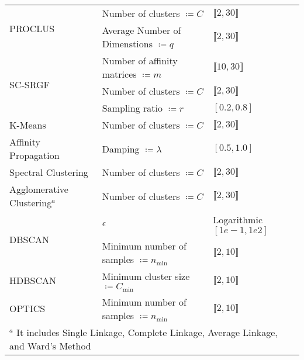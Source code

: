 \begin{table}[h]
\begin{center}
\begin{small}
\begin{sc}
\begin{tabular}{@{}lll@{}}
\multirow{2}{*}{PROCLUS}        & Number of clusters $\coloneqq C$                       & $\llbracket2,30\rrbracket$                     \\
                                & Average Number of Dimenstions $\coloneqq q$            & $\llbracket2,30\rrbracket$                     \\ \midrule
\multirow{3}{*}{SC-SRGF}        & Number of affinity matrices $\coloneqq m$              & $\llbracket10,30\rrbracket$                    \\
                                & Number of clusters $\coloneqq C$                       & $\llbracket2,30\rrbracket$                     \\
                                & Sampling ratio $\coloneqq r$                           & $\left[0.2,0.8\right]$                         \\ \midrule
K-Means                         & Number of clusters $\coloneqq C$                       & $\llbracket2,30\rrbracket$                     \\ \midrule
Affinity Propagation            & Damping $\coloneqq \lambda$                            & $\left[0.5,1.0\right]$                         \\ \midrule
Spectral Clustering             & Number of clusters $\coloneqq C$                       & $\llbracket2,30\rrbracket$                     \\ \midrule
Agglomerative Clustering$^a$    & Number of clusters $\coloneqq C$                       & $\llbracket2,30\rrbracket$                     \\ \midrule
\multirow{2}{*}{DBSCAN}         & $\epsilon$                                             & Logarithmic $\left[1e-1,1e2\right]$            \\
                                & Minimum number of samples $\coloneqq n_{\text{min}}$   & $\llbracket2,10\rrbracket$                     \\ \midrule
HDBSCAN                         & Minimum cluster size $\coloneqq C_{\text{min}}$        & $\llbracket2,10\rrbracket$                     \\ \midrule
OPTICS                          & Minimum number of samples $\coloneqq n_{\text{min}}$   & $\llbracket2,10\rrbracket$                     \\ \bottomrule
\multicolumn{3}{l}{\footnotesize{$^a$ It includes Single Linkage, Complete Linkage, Average Linkage, and Ward’s Method}}
\end{tabular}
    \end{sc}
    \end{small}
    \end{center}
    \vskip -0.1in
\end{table}

